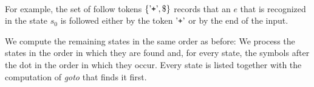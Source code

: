 \\[0.2cm]
For example, the set of follow tokens $\{\saquoted{+}, \symbol{36}\}$ records that an $e$ that is recognized in
the state $s_0$ is followed either by the token $\mbox{'\texttt{+}'}$ or by the end of the input.

We compute the remaining states in the same order as before:  We process the states in the order in which they
are found and, for every state, the symbols after the dot in the order in which they occur.  Every state is listed
together with the computation of \textsl{goto} that finds it first.
